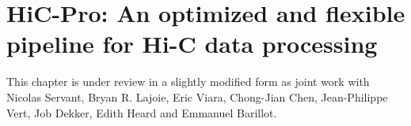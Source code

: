 \chapter{HiC-Pro: An optimized and flexible pipeline for Hi-C data
processing}

\graphicspath{{11_tmc/}}

\begin{work}

This chapter is under review in a slightly modified form as joint work with
Nicolas Servant, Bryan R. Lajoie, Eric Viara, Chong-Jian Chen, Jean-Philippe
Vert, Job Dekker, Edith Heard and Emmanuel Barillot.

\end{work}


